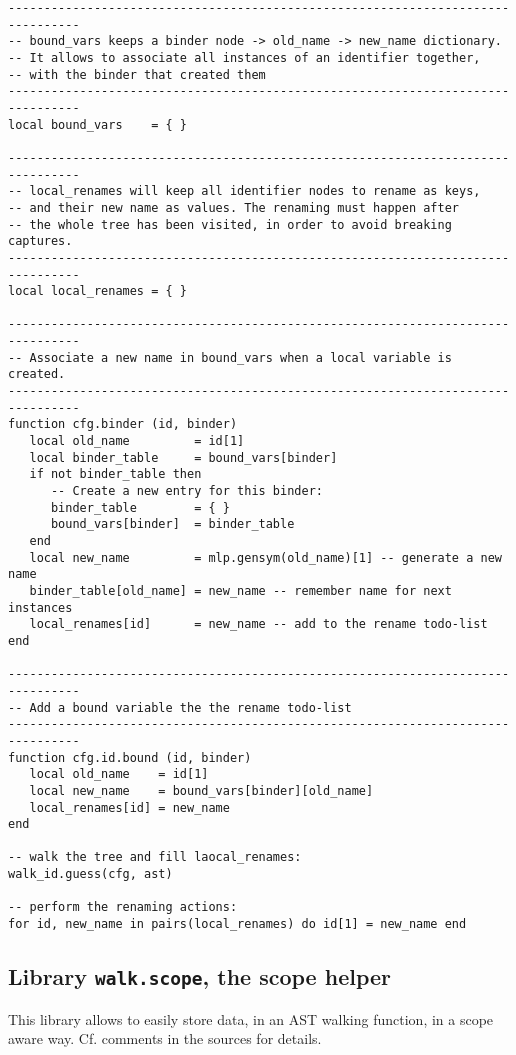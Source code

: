 \begin{Verbatim}[fontsize=\scriptsize]
--------------------------------------------------------------------------------
-- bound_vars keeps a binder node -> old_name -> new_name dictionary.
-- It allows to associate all instances of an identifier together,
-- with the binder that created them
--------------------------------------------------------------------------------
local bound_vars    = { }

--------------------------------------------------------------------------------
-- local_renames will keep all identifier nodes to rename as keys,
-- and their new name as values. The renaming must happen after 
-- the whole tree has been visited, in order to avoid breaking captures.
--------------------------------------------------------------------------------
local local_renames = { }

--------------------------------------------------------------------------------
-- Associate a new name in bound_vars when a local variable is created.
--------------------------------------------------------------------------------
function cfg.binder (id, binder)
   local old_name         = id[1]
   local binder_table     = bound_vars[binder]
   if not binder_table then
      -- Create a new entry for this binder:
      binder_table        = { }
      bound_vars[binder]  = binder_table
   end
   local new_name         = mlp.gensym(old_name)[1] -- generate a new name
   binder_table[old_name] = new_name -- remember name for next instances
   local_renames[id]      = new_name -- add to the rename todo-list
end

--------------------------------------------------------------------------------
-- Add a bound variable the the rename todo-list
--------------------------------------------------------------------------------
function cfg.id.bound (id, binder)
   local old_name    = id[1]
   local new_name    = bound_vars[binder][old_name]
   local_renames[id] = new_name
end

-- walk the tree and fill laocal_renames:
walk_id.guess(cfg, ast)

-- perform the renaming actions:
for id, new_name in pairs(local_renames) do id[1] = new_name end
\end{Verbatim}

\subsection{Library {\tt walk.scope}, the scope helper}
This library allows to easily store data, in an AST walking function, in a scope
aware way. Cf. comments in the sources for details.
